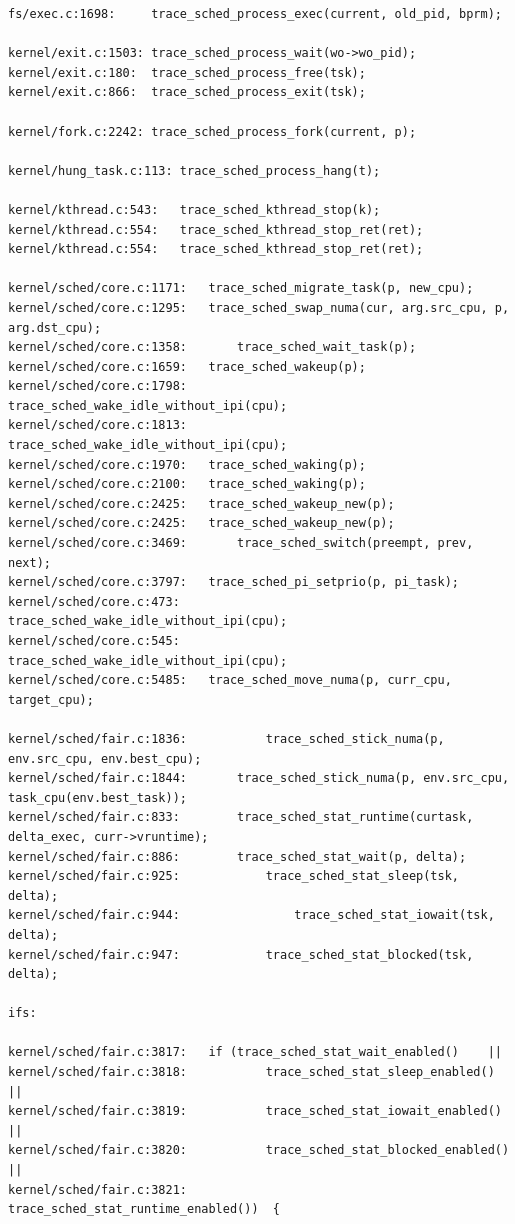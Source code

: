 \documentclass[10pt]{book}
\begin{document}
\begin{Verbatim}
fs/exec.c:1698:		trace_sched_process_exec(current, old_pid, bprm);

kernel/exit.c:1503:	trace_sched_process_wait(wo->wo_pid);
kernel/exit.c:180:	trace_sched_process_free(tsk);
kernel/exit.c:866:	trace_sched_process_exit(tsk);

kernel/fork.c:2242:	trace_sched_process_fork(current, p);

kernel/hung_task.c:113:	trace_sched_process_hang(t);

kernel/kthread.c:543:	trace_sched_kthread_stop(k);
kernel/kthread.c:554:	trace_sched_kthread_stop_ret(ret);
kernel/kthread.c:554:	trace_sched_kthread_stop_ret(ret);

kernel/sched/core.c:1171:	trace_sched_migrate_task(p, new_cpu);
kernel/sched/core.c:1295:	trace_sched_swap_numa(cur, arg.src_cpu, p, arg.dst_cpu);
kernel/sched/core.c:1358:		trace_sched_wait_task(p);
kernel/sched/core.c:1659:	trace_sched_wakeup(p);
kernel/sched/core.c:1798:			trace_sched_wake_idle_without_ipi(cpu);
kernel/sched/core.c:1813:		trace_sched_wake_idle_without_ipi(cpu);
kernel/sched/core.c:1970:	trace_sched_waking(p);
kernel/sched/core.c:2100:	trace_sched_waking(p);
kernel/sched/core.c:2425:	trace_sched_wakeup_new(p);
kernel/sched/core.c:2425:	trace_sched_wakeup_new(p);
kernel/sched/core.c:3469:		trace_sched_switch(preempt, prev, next);
kernel/sched/core.c:3797:	trace_sched_pi_setprio(p, pi_task);
kernel/sched/core.c:473:		trace_sched_wake_idle_without_ipi(cpu);
kernel/sched/core.c:545:		trace_sched_wake_idle_without_ipi(cpu);
kernel/sched/core.c:5485:	trace_sched_move_numa(p, curr_cpu, target_cpu);

kernel/sched/fair.c:1836:			trace_sched_stick_numa(p, env.src_cpu, env.best_cpu);
kernel/sched/fair.c:1844:		trace_sched_stick_numa(p, env.src_cpu, task_cpu(env.best_task));
kernel/sched/fair.c:833:		trace_sched_stat_runtime(curtask, delta_exec, curr->vruntime);
kernel/sched/fair.c:886:		trace_sched_stat_wait(p, delta);
kernel/sched/fair.c:925:			trace_sched_stat_sleep(tsk, delta);
kernel/sched/fair.c:944:				trace_sched_stat_iowait(tsk, delta);
kernel/sched/fair.c:947:			trace_sched_stat_blocked(tsk, delta);

ifs:

kernel/sched/fair.c:3817:	if (trace_sched_stat_wait_enabled()    ||
kernel/sched/fair.c:3818:			trace_sched_stat_sleep_enabled()   ||
kernel/sched/fair.c:3819:			trace_sched_stat_iowait_enabled()  ||
kernel/sched/fair.c:3820:			trace_sched_stat_blocked_enabled() ||
kernel/sched/fair.c:3821:			trace_sched_stat_runtime_enabled())  {

\end{Verbatim}
\end{document}
